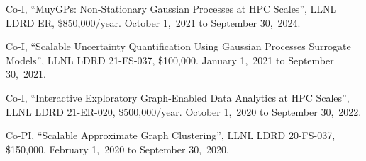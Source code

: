 \begin{innerlist}

\item Co-I,
	``MuyGPs: Non-Stationary Gaussian Processes at HPC Scales'',
	LLNL LDRD ER,
	\$850,000/year.
	October 1,~2021 to September 30,~2024.

\item Co-I,
	``Scalable Uncertainty Quantification Using Gaussian Processes Surrogate Models'',
	LLNL LDRD 21-FS-037,
	\$100,000.
	January 1,~2021 to September 30,~2021.

\item Co-I,
        ``Interactive Exploratory Graph-Enabled Data Analytics at HPC Scales'',
        LLNL LDRD 21-ER-020,
        \$500,000/year.
        October 1,~2020 to September 30,~2022.

\item Co-PI,
	``Scalable Approximate Graph Clustering'',
	LLNL LDRD 20-FS-037,
	\$150,000.
	February 1,~2020 to September 30,~2020.

\end{innerlist}
